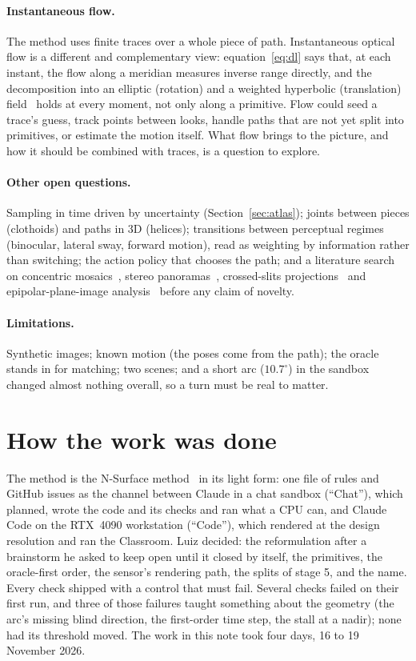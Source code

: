 \documentclass[11pt,a4paper]{article}
\begin{document}
\paragraph{Instantaneous flow.} The method uses finite traces over a whole piece of path. Instantaneous optical flow is a
different and complementary view: equation~\eqref{eq:dl} says that, at each instant, the flow along a meridian measures
inverse range directly, and the decomposition into an elliptic (rotation) and a weighted hyperbolic (translation)
field~\cite{longuethiggins} holds at every moment, not only along a primitive. Flow could seed a trace's guess, track
points between looks, handle paths that are not yet split into primitives, or estimate the motion itself. What flow brings
to the picture, and how it should be combined with traces, is a question to explore.

\paragraph{Other open questions.} Sampling in time driven by uncertainty (Section~\ref{sec:atlas}); joints between pieces
(clothoids) and paths in 3D (helices); transitions between perceptual regimes (binocular, lateral sway, forward motion),
read as weighting by information rather than switching; the action policy that chooses the path; and a literature search on
concentric mosaics~\cite{shum}, stereo panoramas~\cite{peleg}, crossed-slits projections~\cite{zomet} and
epipolar-plane-image analysis~\cite{bolles} before any claim of novelty.

\paragraph{Limitations.} Synthetic images; known motion (the poses come from the path); the oracle stands in for matching;
two scenes; and a short arc ($10.7^\circ$) in the sandbox changed almost nothing overall, so a turn must be real to matter.

\section{How the work was done}\label{sec:process}

The method is the N-Surface method~\cite{nsurface} in its light form: one file of rules and GitHub issues as the channel
between Claude in a chat sandbox (``Chat''), which planned, wrote the code and its checks and ran what a CPU can, and
Claude Code on the RTX~4090 workstation (``Code''), which rendered at the design resolution and ran the Classroom. Luiz
decided: the reformulation after a brainstorm he asked to keep open until it closed by itself, the primitives, the
oracle-first order, the sensor's rendering path, the splits of stage 5, and the name. Every check shipped with a control
that must fail. Several checks failed on their first run, and three of those failures taught something about the
geometry (the arc's missing blind direction, the first-order time step, the stall at a nadir); none had its threshold
moved. The work in this note took four days, 16 to 19 November 2026.
\end{document}
